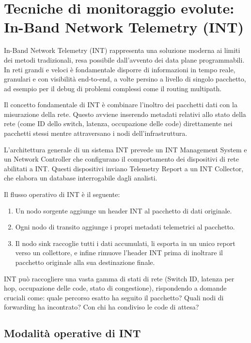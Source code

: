 \section{Tecniche di monitoraggio evolute: In-Band Network Telemetry (INT)}

In-Band Network Telemetry (INT) rappresenta una soluzione moderna ai limiti
dei metodi tradizionali, resa possibile dall'avvento dei data plane programmabili.
In reti grandi e veloci è fondamentale disporre di informazioni in tempo reale,
granulari e con visibilità end-to-end, a volte persino a livello di singolo
pacchetto, ad esempio per il debug di problemi complessi come il routing multipath.

Il concetto fondamentale di INT è combinare l'inoltro dei pacchetti dati con
la misurazione della rete. Questo avviene inserendo metadati relativi allo
stato della rete (come ID dello switch, latenza, occupazione delle code)
direttamente nei pacchetti stessi mentre attraversano i nodi dell'infrastruttura.

L'architettura generale di un sistema INT prevede un INT Management System
e un Network Controller che configurano il comportamento dei dispositivi di
rete abilitati a INT. Questi dispositivi inviano Telemetry Report a un
INT Collector, che elabora un database interrogabile dagli analisti.

Il flusso operativo di INT è il seguente:
\begin{enumerate}
\item Un nodo sorgente aggiunge un header INT al pacchetto di dati originale.
\item Ogni nodo di transito aggiunge i propri metadati telemetrici al pacchetto.
\item Il nodo sink raccoglie tutti i dati accumulati, li esporta in un unico
report verso un collettore, e infine rimuove l'header INT prima di inoltrare
il pacchetto originale alla sua destinazione finale.
\end{enumerate}

INT può raccogliere una vasta gamma di stati di rete (Switch ID, latenza per
hop, occupazione delle code, stato di congestione), rispondendo a domande cruciali
come: quale percorso esatto ha seguito il pacchetto? Quali nodi di forwarding
ha incontrato? Con chi ha condiviso le code di attesa?

\subsection{Modalità operative di INT}

